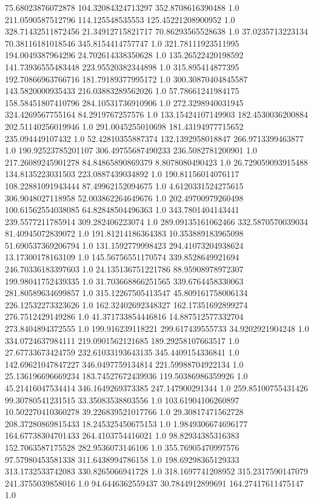 75.68023876072878	104.32084324713297	352.8708616390488	1.0
211.0590587512796	114.125548535553	125.45221208900952	1.0
328.71432511872456	21.34912715821717	70.86293565528638	1.0
37.0235713223134	70.38116181018546	345.8154414757747	1.0
321.78111923511995	194.0049387964296	24.702614338350628	1.0
135.26522420198592	141.73936555483448	223.95520382344898	1.0
315.895414877395	192.70866963766716	181.79189377995172	1.0
300.30870404845587	143.5820000935433	216.03883289562026	1.0
57.78661241984175	158.58451807410796	284.10531736910906	1.0
272.3298940031945	324.4269567755164	84.2919767257576	1.0
133.15424107149903	182.4530036200884	202.51140256019946	1.0
291.0045255010698	181.43194977715652	235.094449107432	1.0
52.42810355887374	132.1392958018847	266.9713399463877	1.0
190.92523785201107	306.49755687490233	236.5082781200901	1.0
217.26089245901278	84.84865890869379	8.8078080490423	1.0
26.729059093915488	134.8135223031503	223.0887439034892	1.0
190.81156014076117	108.22881091943444	87.49962152094675	1.0
4.6120331524275615	306.9048027118958	52.003862264649676	1.0
202.49700979260498	100.61562554038085	64.82848504496363	1.0
343.7801404143441	239.5577211785914	309.282406223074	1.0
289.09135161062466	332.5870570039034	81.40945072839072	1.0
191.81214186364383	10.353889183965098	51.690537369206794	1.0
131.1592779998423	294.41073204938624	13.17300178163109	1.0
145.56756551170574	339.8528649921694	246.70336183397603	1.0
24.135136751221786	88.95908978972307	199.98041752439335	1.0
31.703668866251565	339.6764458330063	281.80589634699857	1.0
315.12267505413547	45.809161758006134	226.12532273323626	1.0
162.32402692348327	162.17351692899274	276.7512429149286	1.0
41.371733854446816	14.887512577332704	273.8404894372555	1.0
199.916239118221	299.617439555733	34.9202921904248	1.0
334.0724637984111	219.0901562121685	189.29258107663517	1.0
27.67733673424759	232.61033193643135	345.4409154336841	1.0
142.69621047847227	346.0497759134814	221.59988704922134	1.0
25.136196696669234	183.74527672439936	119.50386986359926	1.0
45.21416047534414	346.1649269373385	247.147900291344	1.0
259.85100755431426	99.30780541231515	33.35083538803556	1.0
103.61904106260897	10.502270410360278	39.226839521017766	1.0
29.30817471562728	208.37280869815433	18.245325450675153	1.0
1.9849306674696177	164.67738304701433	264.4103754416021	1.0
98.82934385316383	152.7063587175528	282.9536073146106	1.0
355.76905470997576	97.57980453581338	311.6438994786158	1.0
198.69298365129333	313.1732533742083	330.8265066941728	1.0
318.1697741208952	315.2317590147079	241.3755039858016	1.0
94.6446362559437	30.7844912899691	164.27417611475147	1.0
